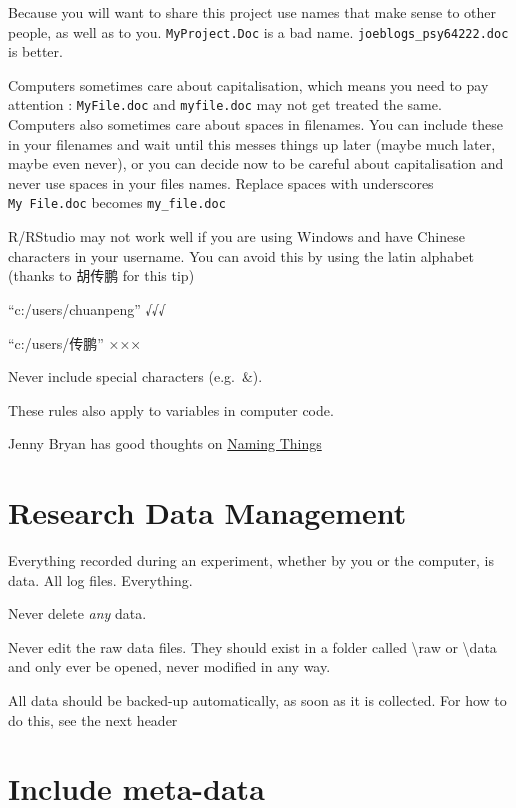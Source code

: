 \documentclass[
]{book}
\begin{document}
Because you will want to share this project use names that make sense to other people, as well as to you. \texttt{MyProject.Doc} is a bad name. \texttt{joeblogs\_psy64222.doc} is better.

Computers sometimes care about capitalisation, which means you need to pay attention : \texttt{MyFile.doc} and \texttt{myfile.doc} may not get treated the same. Computers also sometimes care about spaces in filenames. You can include these in your filenames and wait until this messes things up later (maybe much later, maybe even never), or you can decide now to be careful about capitalisation and never use spaces in your files names. Replace spaces with underscores \texttt{My\ File.doc} becomes \texttt{my\_file.doc}

R/RStudio may not work well if you are using Windows and have Chinese characters in your username. You can avoid this by using the latin alphabet (thanks to 胡传鹏 for this tip)

``c:/users/chuanpeng'' √√√

``c:/users/传鹏'' ×××

Never include special characters (e.g.~\&).

These rules also apply to variables in computer code.

Jenny Bryan has good thoughts on \href{http://www2.stat.duke.edu/~rcs46/lectures_2015/01-markdown-git/slides/naming-slides/naming-slides.pdf}{Naming Things}

\hypertarget{research-data-management}{%
\section{Research Data Management}\label{research-data-management}}

Everything recorded during an experiment, whether by you or the computer, is data. All log files. Everything.

Never delete \emph{any} data.

Never edit the raw data files. They should exist in a folder called \textbackslash raw or \textbackslash data and only ever be opened, never modified in any way.

All data should be backed-up automatically, as soon as it is collected. For how to do this, see the next header

\hypertarget{include-meta-data}{%
\section{Include meta-data}\label{include-meta-data}}
\end{document}
